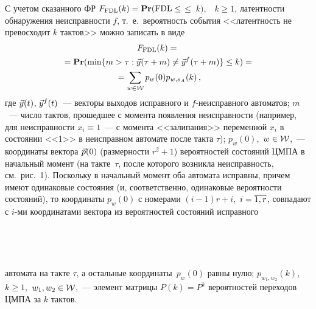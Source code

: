 \begin{multicols}{2}
\medskip
 С учетом сказанного ФР $F_{\mathrm{FDL}}(k)={\bf Pr}(\mathrm{FDL}\le$\linebreak $\le\; k)$,\ \ $k \ge 1$,
латентности обнаружения не\-ис\-прав\-ности $f$, т.\ е.\ вероятность события
<<латентность не превосходит $k$ тактов>> можно записать в виде
\begin{multline}
F_{\mathrm{FDL}}(k)
={}\\
{}=
{\bf Pr}(\min\{m > \tau: \vec y(\tau + m) \ne \vec y^f(\tau + m)\} \le
 k)={}\\
 {}=
\sum_{w\in {\cal W}} p_w(0) p_{w,s_A}(k)\,,
\label{3}
\end{multline}
где
$\vec y(t)$, $\vec y^f(t)$~--- векторы выходов исправного и
$f$-неисправного автоматов;
$m$~--- число тактов, прошедшее с момента появления неисправности
(например, для неисправности $x_i \equiv 1$~--- с момента <<залипания>>
переменной $x_i$ в состоянии <<1>> в неисправном автомате после такта $\tau$);
$p_w(0)$,\ $w\in{\cal W}$,~--- координаты вектора $\vec p(0)$
(размерности $r^2 + 1$) вероятностей состояний ЦМПА в начальный момент
(на такте~$\tau$, после которого возникла неисправность, см.\ рис.~1).
Поскольку в начальный момент оба автомата исправны, причем имеют одинаковые
состояния (и, соответственно, одинаковые вероятности состояний), то
координаты $p_w(0)$ с номерами $(i-1)r+i$,\ $i=\overline{1,r}$, совпадают с
$i$-ми координатами вектора из вероятностей состояний исправного
\begin{figure*} %
\vspace*{1pt}
\begin{minipage}[t]{81mm}
\begin{center}
\vspace*{1pt}
\mbox{%
\epsfxsize=72.248mm
}
\end{center}
\vspace*{-9pt}
\end{minipage}
\hfill
\begin{minipage}[t]{81mm}
\begin{center}
\vspace*{1pt}
\mbox{%
\epsfxsize=72.51mm
}
\end{center}
\vspace*{-9pt}
\end{minipage}
\end{figure*}
автомата
на такте $\tau$, а остальные координаты~$p_w(0)$ равны нулю;
$p_{w_1,w_2}(k)$,\ $k \ge 1$,\ $w_1,w_2\in {\cal W}$,~---
элемент матрицы $P(k) = P^k$ вероятностей переходов ЦМПА за $k$ тактов.


\end{multicols}
